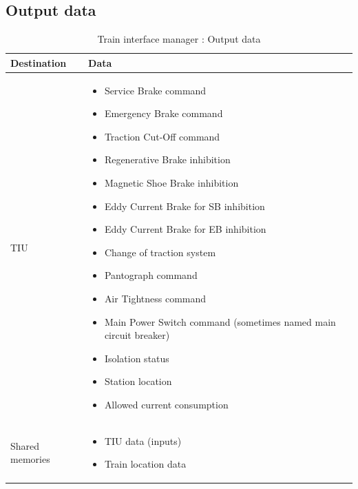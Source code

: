 \documentclass[nocc]{template/openetcs_report}
\begin{document}
\subsection{Output data}
			\begin{longtable}{|l|l|}
				\caption{Train interface manager : Output data}\\ 
				\hline
				
					\begin{minipage}[t]{0.35\linewidth} \textbf{Destination}	\end{minipage} 
				&	\begin{minipage}[t]{0.65\linewidth} \textbf{Data} \end{minipage} \\
				
				\hline
																																													
					\begin{minipage}[t]{0.35\linewidth} TIU	\end{minipage} 
				&	\begin{minipage}[t]{0.65\linewidth}
						\begin{itemize}
							\item Service Brake command
							\item Emergency Brake command
							\item Traction Cut-Off command
							\item Regenerative Brake inhibition
							\item Magnetic Shoe Brake inhibition
							\item Eddy Current Brake for SB inhibition
							\item Eddy Current Brake for EB inhibition
							\item Change of traction system
							\item Pantograph command
							\item Air Tightness command
							\item Main Power Switch command (sometimes named main circuit breaker)
							\item Isolation status
							\item Station location
							\item Allowed current consumption
						\end{itemize}			
					\end{minipage} \\
				
				\hline	
				
					\begin{minipage}[t]{0.35\linewidth} Shared memories	\end{minipage} 
				&	\begin{minipage}[t]{0.65\linewidth}
						\begin{itemize}
							\item TIU data (inputs)
							\item Train location data
						\end{itemize}				
					\end{minipage} \\
				
				\hline	
			\end{longtable}
\newpage
\end{document}
